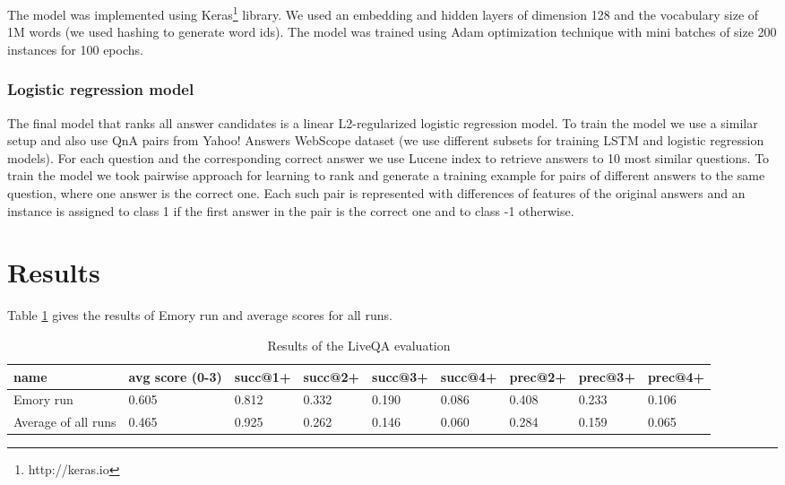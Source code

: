 \documentclass[]{article}
\begin{document}
The model was implemented using Keras\footnote{http://keras.io} library.
We used an embedding and hidden layers of dimension 128 and the vocabulary size of 1M words (we used hashing to generate word ids).
The model was trained using Adam optimization technique \cite{kingma2014adam} with mini batches of size 200 instances for 100 epochs.

\subsubsection{Logistic regression model}

The final model that ranks all answer candidates is a linear L2-regularized logistic regression model.
To train the model we use a similar setup and also use QnA pairs from Yahoo! Answers WebScope dataset (we use different subsets for training LSTM and logistic regression models). 
For each question and the corresponding correct answer we use Lucene index to retrieve answers to 10 most similar questions.
To train the model we took pairwise approach for learning to rank and generate a training example for pairs of different answers to the same question, where one answer is the correct one.
Each such pair is represented with differences of features of the original answers and an instance is assigned to class 1 if the first answer in the pair is the correct one and to class -1 otherwise.

\section{Results}

Table \ref{table:liveqa-results} gives the results of Emory run and average scores for all runs.

\begin{table}
\caption{Results of the LiveQA evaluation}
\label{table:liveqa-results}
\begin{tabular}{|p{1.2cm}|p{1.2cm}|p{1.2cm}|p{1.2cm}|p{1.2cm}|p{1.2cm}|p{1.2cm}|p{1.2cm}|p{1.2cm}|}
\hline
name & avg score (0-3) & succ@1+ & succ@2+ & succ@3+ & succ@4+ & prec@2+ &
 prec@3+ & prec@4+ \\
 \hline
Emory run & 0.605 & 0.812 & 0.332 & 0.190 & 0.086 & 0.408 & 0.233 & 0.106\\
\hline
Average of all runs & 0.465 & 0.925 & 0.262 & 0.146 & 0.060 & 0.284 & 0.159 & 0.065\\
\hline
\end{tabular}
\end{table}
\end{document}
